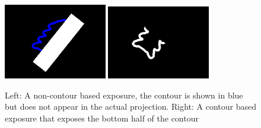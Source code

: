 \documentclass[11pt]{article}
\begin{document}
\begin{figure}[h!]
  \begin{center}
    \includegraphics[width=0.4\textwidth]{exposure}    
    \includegraphics[width=0.4\textwidth]{mask}    
  \end{center}

  \caption{Left: A non-contour based exposure, the contour is shown in blue but does not appear in the actual projection. Right: A contour based exposure that exposes the bottom half of the contour}
  \label{fig:rotation_signal}
\end{figure}

\end{document}
